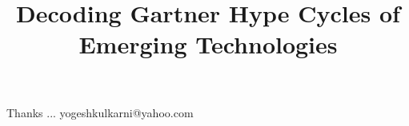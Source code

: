 \documentclass[xcolor=dvipsnames,compress,t,pdf,9pt]{beamer}
\title[\insertframenumber /\inserttotalframenumber]{Decoding Gartner Hype Cycles of Emerging Technologies}
\begin{document}
	\begin{frame}
	\titlepage
	\end{frame}

	
	
	\begin{frame}[c]{}
	Thanks ...
	\vspace{5mm}
	yogeshkulkarni@yahoo.com
	\end{frame}
\end{document}
